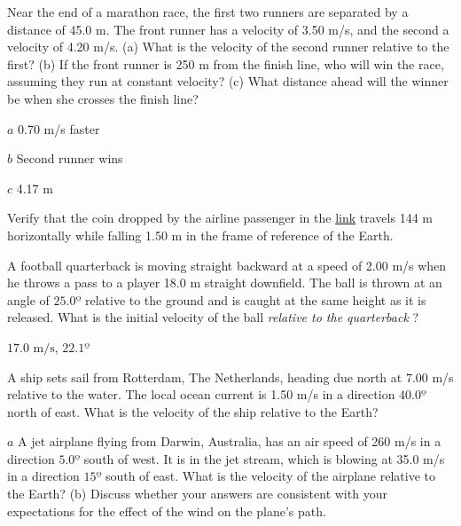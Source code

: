 \documentclass[
]{book}
\begin{document}
\hypertarget{fs-id1374901}{}
\leavevmode{}%
Near the end of a marathon race, the first two runners are separated by
a distance of 45.0 m. The front runner has a velocity of 3.50 m/s, and
the second a velocity of 4.20 m/s. (a) What is the velocity of the
second runner relative to the first? (b) If the front runner is 250 m
from the finish line, who will win the race, assuming they run at
constant velocity? (c) What distance ahead will the winner be when she
crosses the finish line?

\leavevmode{}%
\(a\) 0.70 m/s faster

\(b\) Second runner wins

\(c\) 4.17 m

\hypertarget{fs-id1543938}{}
\leavevmode{}%
Verify that the coin dropped by the airline passenger in the
\protect\hyperlink{fs-id1890300}{link} travels 144 m horizontally
while falling 1.50 m in the frame of reference of the Earth.

\hypertarget{fs-id1678133}{}
\leavevmode{}%
A football quarterback is moving straight backward at a speed of 2.00
m/s when he throws a pass to a player 18.0 m straight downfield. The
ball is thrown at an angle of \(25.0º\) relative to the ground and is
caught at the same height as it is released. What is the initial
velocity of the ball \emph{relative to the quarterback} ?

\leavevmode{}%
\({17\text{.}\text{0\ m/s}}{}\), \({\text{22}\text{.}1º}{}\)

\hypertarget{fs-id1545568}{}
\leavevmode{}%
A ship sets sail from Rotterdam, The Netherlands, heading due north at
7.00 m/s relative to the water. The local ocean current is 1.50 m/s in a
direction \(\text{40.0º}{}\) north of east. What is the velocity of the
ship relative to the Earth?

\hypertarget{eip-741}{}
\leavevmode{}%
\(a\) A jet airplane flying from Darwin, Australia, has an air speed of
260 m/s in a direction \(5.0º{}\) south of west. It is in the jet stream,
which is blowing at 35.0 m/s in a direction \(15º{}\) south of east. What
is the velocity of the airplane relative to the Earth? (b) Discuss
whether your answers are consistent with your expectations for the
effect of the wind on the plane's path.
\end{document}
